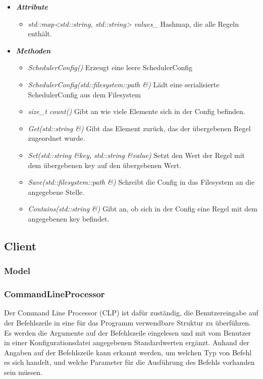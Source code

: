 \documentclass[a4paper,12pt]{article}
\begin{document}
\begin{itemize}[label={}]

	\item \textit{\textbf{Attribute}}
		\begin{itemize}[label={\textbullet}]
			\item \textit{std::map<std::string, std::string> values\_} Hashmap, die alle Regeln enthält.
		\end{itemize}

	\item \textit{\textbf{Methoden}}
		\begin{itemize}[label={\textbullet}]
			\item \textit{SchedulerConfig()} Erzeugt eine leere SchedulerConfig
			\item \textit{SchedulerConfig(std::filesystem::path \&)} Lädt eine serialisierte SchedulerConfig aus dem Filesystem
			\item \textit{size\_t count()} Gibt an wie viele Elemente sich in der Config befinden.
			\item \textit{Get(std::string \&)} Gibt das Element zurück, das der übergebenen Regel zugeordnet wurde.
			\item \textit{Set(std::string \&key, std::string \&value)} Setzt den Wert der Regel mit dem übergebenen key auf den übergebenen Wert.
			\item \textit{Save(std::filesystem::path \&)} Schreibt die Config in das Filesystem an die angegebene Stelle.
			\item \textit{Contains(std::string \&)} Gibt an, ob sich in der Config eine Regel mit dem angegebenen key befindet.
		\end{itemize}


\end{itemize}
\clearpage
\subsection{Client}

\subsubsection{Model}


\subsubsection{CommandLineProcessor}

Der Command Line Processor (CLP) ist dafür zuständig, die Benutzereingabe auf der Befehlszeile in eine für das Programm verwendbare Struktur zu überführen. Es werden die Argumente auf der Befehlszeile eingelesen und mit vom Benutzer in einer Konfigurationsdatei angegebenen Standardwerten ergänzt. Anhand der Angaben auf der Befehlszeile kann erkannt werden, um welchen Typ von Befehl es sich handelt, und welche Parameter für die Ausführung des Befehls vorhanden sein müssen.
\end{document}
